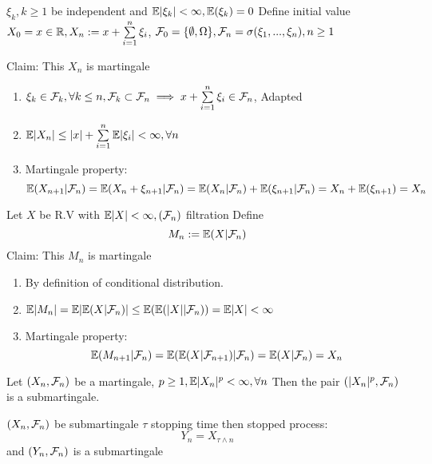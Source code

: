 \newpage
\begin{example}
$\xi_k, k\geq 1$ be independent and $\mathbb{E}|\xi_k|<\infty, \mathbb{E}(\xi_k) = 0$ Define initial value $X_0 = x \in \mathbb{R}, X_n := x + \sum\limits_{i=1}^n \xi_i$, $\mathcal{F}_0 = \{\emptyset,\Omega\}, \mathcal{F}_n = \sigma(\xi_1, ..., \xi_n), n\geq 1$
\end{example}
Claim: This $X_n$ is martingale
\begin{enumerate}
    \item $\xi_k \in \mathcal{F}_k, \forall k\leq n, \mathcal{F}_k \subset \mathcal{F}_n\implies x + \sum\limits_{i=1}^n \xi_i \in \mathcal{F}_n $, Adapted
    \item $\mathbb{E}|X_n| \leq |x| + \sum\limits_{i=1}^n \mathbb{E}|\xi_i| < \infty,\forall n$
    \item Martingale property:
    \begin{equation*}
        \mathbb{E}(X_{n+1}|\mathcal{F}_n) = \mathbb{E}(X_{n} +\xi_{n+1}|\mathcal{F}_n) = \mathbb{E}(X_{n}|\mathcal{F}_n) +\mathbb{E}(\xi_{n+1}|\mathcal{F}_n) = X_{n} + \mathbb{E}(\xi_{n+1}) = X_{n}
    \end{equation*}
\end{enumerate}
\vspace{2cm}
\begin{example}
Let $X$ be R.V with $\mathbb{E}|X|<\infty, (\mathcal{F}_n)$ filtration Define \begin{equation*}
    M_n := \mathbb{E}(X | \mathcal{F}_n)
\end{equation*}
Claim: This $M_n$ is martingale
\begin{enumerate}
    \item By definition of conditional distribution.
    \item $\mathbb{E}|M_n| =\mathbb{E}|\mathbb{E}(X | \mathcal{F}_n)| \leq \mathbb{E}(\mathbb{E}(|X| | \mathcal{F}_n)) = \mathbb{E}|X| < \infty$
    \item Martingale property:
    \begin{equation*}
        \mathbb{E}(M_{n+1}|\mathcal{F}_n) = \mathbb{E}(\mathbb{E}(X |\mathcal{F}_{n+1})|\mathcal{F}_n) = \mathbb{E}(X|\mathcal{F}_n) = X_{n}
    \end{equation*}
\end{enumerate}
\end{example}
\vspace{2cm}
\begin{prop}
Let $(X_n, \mathcal{F}_n)$ be a martingale, $p \geq 1, \mathbb{E}|X_n|^p < \infty, \forall n$ Then the pair $(|X_n|^p, \mathcal{F}_n)$ is a submartingale.
\end{prop}
\pf
\newpage
$(X_n, \mathcal{F}_n)$ be submartingale $\tau$ stopping time then stopped process:
\begin{equation*}
    Y_n = X_{\tau \wedge n}
\end{equation*}and $(Y_n, \mathcal{F}_n)$ is a submartingale
\pf\vspace{10cm}

